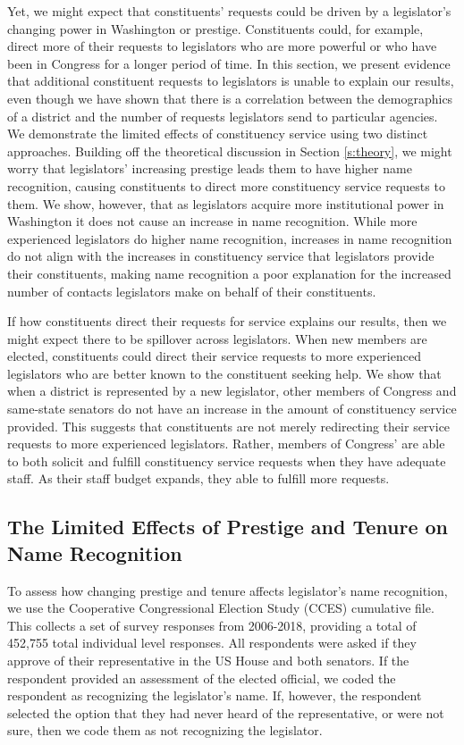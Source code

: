 \documentclass{article}
\begin{document}
Yet, we might expect that constituents' requests could be driven by a legislator's changing power in Washington or prestige.  Constituents could, for example, direct more of their requests to legislators who are more powerful or who have been in Congress for a longer period of time.  In this section, we present evidence that additional constituent requests to legislators is unable to explain our results, even though we have shown that there is a correlation between the demographics of a district and the number of requests legislators send to particular agencies.  We demonstrate the limited effects of constituency service using two distinct approaches.  Building off the theoretical discussion in Section \ref{s:theory}, we might worry that legislators' increasing prestige leads them to have higher name recognition, causing constituents to direct more constituency service requests to them.  We show, however, that as legislators acquire more institutional power in Washington it does not cause an increase in name recognition.  While more experienced legislators do higher name recognition, increases in name recognition do not align with the increases in constituency service that legislators provide their constituents, making name recognition a poor explanation for the increased number of contacts legislators make on behalf of their constituents.   

If how constituents direct their requests for service explains our results, then we might expect there to be spillover across legislators.  When new members are elected, constituents could direct their service requests to more experienced legislators who are better known to the constituent seeking help.  We show that when a district is represented by a new legislator, other members of Congress and same-state senators do not have an increase in the amount of constituency service provided.  This suggests that constituents are not merely redirecting their service requests to more experienced legislators.  Rather, members of Congress' are able to both solicit and fulfill constituency service requests when they have adequate staff.  As their staff budget expands, they able to fulfill more requests.  

\subsection{The Limited Effects of Prestige and Tenure on Name Recognition}
To assess how changing prestige and tenure affects legislator's name recognition, we use the Cooperative Congressional Election Study (CCES) cumulative file.  This collects a set of survey responses from 2006-2018, providing a total of 452,755 total individual level responses.  All respondents were asked if they approve of their representative in the US House and both senators.  If the respondent provided an assessment of the elected official, we coded the respondent as recognizing the legislator's name.  If, however, the respondent selected the option that they had never heard of the representative, or were not sure, then we code them as not recognizing the legislator.  
\end{document}
